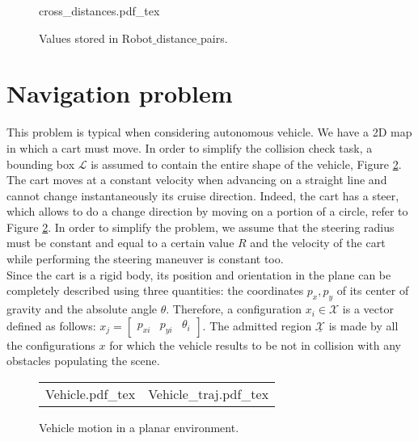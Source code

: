 \begin{figure}
	 \centering
 \def\svgwidth{0.45 \columnwidth}
 {cross_distances.pdf_tex} 
	 \caption{Values stored in Robot$\_$distance$\_$pairs.}
 \label{fig:cross_distances}
 \end{figure}


\section{Navigation problem}

This problem is typical when considering autonomous vehicle. We have a 2D map in which a cart must move. In order to simplify the collision check task, a bounding box $\mathcal{L}$ is assumed to contain the entire shape of the vehicle, Figure \ref{fig:vehicle}. The cart moves at a constant velocity when advancing on a straight line and cannot change instantaneously its cruise direction. Indeed, the cart has a steer, which allows to do a change direction by moving on a portion of a circle, refer to Figure \ref{fig:vehicle}. In order to simplify the problem, we assume that the steering radius must be constant and equal to a certain value $R$ and the velocity of the cart while performing the steering maneuver is constant too. 
\\
Since the cart is a rigid body, its position and orientation in the plane can be completely described using three quantities: the coordinates $p_x,p_y$ of its center of gravity and the absolute angle $\theta$. Therefore, a configuration $x_i \in \mathcal{X}$ is a vector defined as follows: $x_j = \begin{bmatrix} p_{xi} & p_{yi} & \theta _i  \end{bmatrix}$. The admitted region $\underline{\mathcal{X}}$  is made by all the configurations $x$ for which the vehicle results to be not in collision with any obstacles populating the scene.

 \begin{figure}
\begin{tabular}{cc}
\begin{minipage}[t]{0.49\textwidth}
	 \centering
 \def\svgwidth{0.85 \columnwidth}
 {Vehicle.pdf_tex} 
\end{minipage}
 & 
\begin{minipage}[t]{0.49\textwidth}
	 \centering
 \def\svgwidth{0.85 \columnwidth}
 {Vehicle_traj.pdf_tex} 
\end{minipage}
\end{tabular} 
	 \caption{Vehicle motion in a planar environment.}
 \label{fig:vehicle}
 \end{figure}
 
